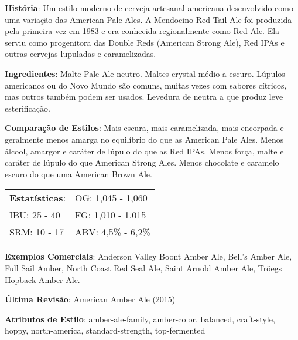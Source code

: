 \textbf{História}: Um estilo moderno de cerveja artesanal americana desenvolvido como uma variação das American Pale Ales. A Mendocino Red Tail Ale foi produzida pela primeira vez em 1983 e era conhecida regionalmente como Red Ale. Ela serviu como progenitora das Double Reds (American Strong Ale), Red IPAs e outras cervejas lupuladas e caramelizadas.

\textbf{Ingredientes}: Malte Pale Ale neutro. Maltes crystal médio a escuro. Lúpulos americanos ou do Novo Mundo são comuns, muitas vezes com sabores cítricos, mas outros também podem ser usados. Levedura de neutra a que produz leve esterificação.

\textbf{Comparação de Estilos}: Mais escura, mais caramelizada, mais encorpada e geralmente menos amarga no equilíbrio do que as American Pale Ales. Menos álcool, amargor e caráter de lúpulo do que as Red IPAs. Menos força, malte e caráter de lúpulo do que American Strong Ales. Menos chocolate e caramelo escuro do que uma American Brown Ale.

\begin{tabular}{@{}p{35mm}p{35mm}@{}}
  \textbf{Estatísticas}: & OG: 1,045 - 1,060 \\
  IBU: 25 - 40  & FG: 1,010 - 1,015  \\
  SRM: 10 - 17  & ABV: 4,5\% - 6,2\%
\end{tabular}

\textbf{Exemplos Comerciais}: Anderson Valley Boont Amber Ale, Bell’s Amber Ale, Full Sail Amber, North Coast Red Seal Ale, Saint Arnold Amber Ale, Tröegs Hopback Amber Ale.

\textbf{Última Revisão}: American Amber Ale (2015)

\textbf{Atributos de Estilo}: amber-ale-family, amber-color, balanced, craft-style, hoppy, north-america, standard-strength, top-fermented
